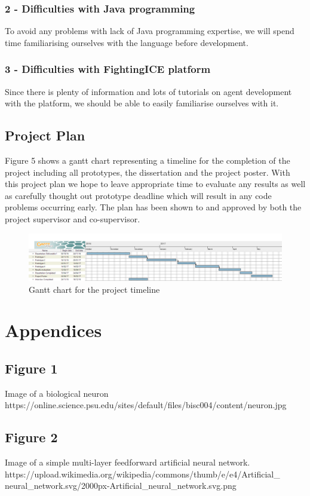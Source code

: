 \documentclass[11pt,a4paper]{article}
\begin{document}
\subsubsection*{2 - Difficulties with Java programming}
To avoid any problems with lack of Java programming expertise, we will spend time familiarising ourselves with the language before development.
\subsubsection*{3 - Difficulties with FightingICE platform}
Since there is plenty of information and lots of tutorials on agent development with the platform, we should be able to easily familiarise ourselves with it.
\newpage
\subsection{Project Plan}
Figure 5 shows a gantt chart representing a timeline for the completion of the project including all prototypes, the dissertation and the project poster. With this project plan we hope to leave appropriate time to evaluate any results as well as carefully thought out prototype deadline which will result in any code problems occurring early. The plan has been shown to and approved by both the project supervisor and co-supervisor.
\vspace{20mm}
\begin{figure}[h]
\includegraphics[width=\textwidth]{gantt}
\caption{Gantt chart for the project timeline}
\end{figure}
\newpage
\section{Appendices}
\subsection*{Figure 1}
Image of a biological neuron\\
https://online.science.psu.edu/sites/default/files/bisc004/content/neuron.jpg
\subsection*{Figure 2}
Image of a simple multi-layer feedforward artificial neural network.\\
 https://upload.wikimedia.org/wikipedia/commons/thumb/e/e4/Artificial\_ neural\_network.svg/2000px-Artificial\_neural\_network.svg.png
\end{document}
